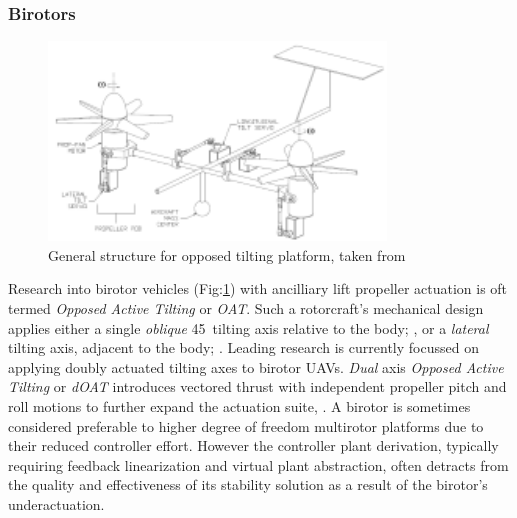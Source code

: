 \subsubsection*{Birotors}
\begin{figure}[hbtp]
\centering
\includegraphics[width=0.8\textwidth]{figs/dualaxistilt}
\caption{General structure for opposed tilting platform, taken from\cite{2007}}
\label{fig:dualaxistilt}
\end{figure}
Research into birotor vehicles (Fig:\ref{fig:dualaxistilt}) with ancilliary lift propeller actuation is oft termed \emph{Opposed Active Tilting} or \emph{OAT}. Such a rotorcraft's mechanical design applies either a single \emph{oblique} 45\textdegree ~tilting axis relative to the body; \cite{smalltwotilting,obliquepitch,passiveobliquetilting}, or a \emph{lateral} tilting axis, adjacent to the body; \cite{tiltrotorUAV,adaptivebackstep,tiltrotorcontrol,tpheonix}. Leading research is currently focussed on applying doubly actuated tilting axes to birotor UAVs. \emph{Dual} axis \emph{Opposed Active Tilting} or \emph{dOAT} introduces vectored thrust with independent propeller pitch and roll motions to further expand the actuation suite, \cite{gres2007,opposedlateraldualaxis}. A birotor is sometimes considered preferable to higher degree of freedom multirotor platforms due to their reduced controller effort. However the controller plant derivation, typically requiring feedback linearization and virtual plant abstraction, often detracts from the quality and effectiveness of its stability solution as a result of the birotor's underactuation. 
\par
